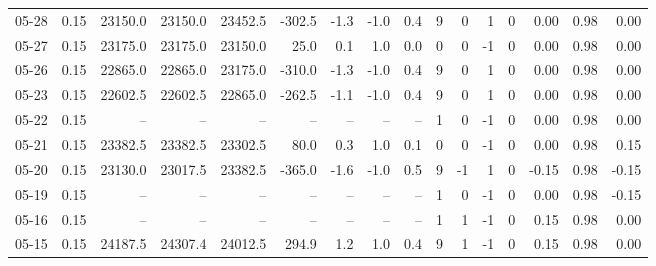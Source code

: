 \begin{threeparttable}
{\begin{tabular}{lrrrrrrrrrrrrrrr}
  05-28 &     0.15 & 23150.0 & 23150.0 & 23452.5 &     -302.5 &           -1.3 &                     -1.0 &                 0.4 &              9 &         0 &     1 &         0 &       0.00 &      0.98 &           0.00 \\
  05-27 &     0.15 & 23175.0 & 23175.0 & 23150.0 &       25.0 &            0.1 &                      1.0 &                 0.0 &              0 &         0 &    -1 &         0 &       0.00 &      0.98 &           0.00 \\
  05-26 &     0.15 & 22865.0 & 22865.0 & 23175.0 &     -310.0 &           -1.3 &                     -1.0 &                 0.4 &              9 &         0 &     1 &         0 &       0.00 &      0.98 &           0.00 \\
  05-23 &     0.15 & 22602.5 & 22602.5 & 22865.0 &     -262.5 &           -1.1 &                     -1.0 &                 0.4 &              9 &         0 &     1 &         0 &       0.00 &      0.98 &           0.00 \\
  05-22 &     0.15 &      -- &      -- &      -- &         -- &             -- &                       -- &                  -- &              1 &         0 &    -1 &         0 &       0.00 &      0.98 &           0.00 \\
  05-21 &     0.15 & 23382.5 & 23382.5 & 23302.5 &       80.0 &            0.3 &                      1.0 &                 0.1 &              0 &         0 &    -1 &         0 &       0.00 &      0.98 &           0.15 \\
  05-20 &     0.15 & 23130.0 & 23017.5 & 23382.5 &     -365.0 &           -1.6 &                     -1.0 &                 0.5 &              9 &        -1 &     1 &         0 &      -0.15 &      0.98 &          -0.15 \\
  05-19 &     0.15 &      -- &      -- &      -- &         -- &             -- &                       -- &                  -- &              1 &         0 &    -1 &         0 &       0.00 &      0.98 &          -0.15 \\
  05-16 &     0.15 &      -- &      -- &      -- &         -- &             -- &                       -- &                  -- &              1 &         1 &    -1 &         0 &       0.15 &      0.98 &           0.00 \\
  05-15 &     0.15 & 24187.5 & 24307.4 & 24012.5 &      294.9 &            1.2 &                      1.0 &                 0.4 &              9 &         1 &    -1 &         0 &       0.15 &      0.98 &           0.00 \\

\end{tabular}}
\end{threeparttable}
